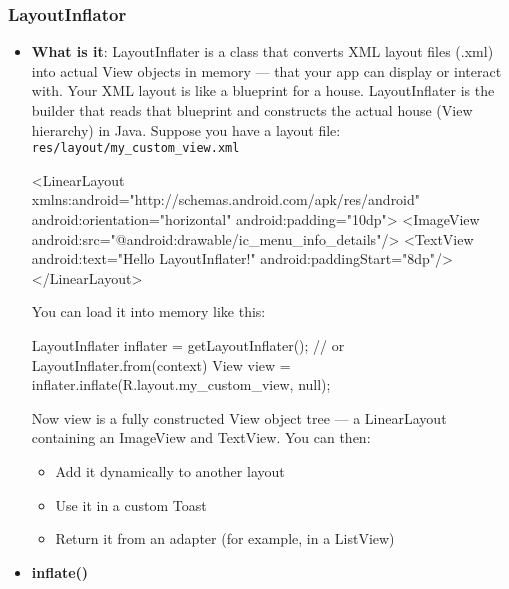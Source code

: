 \documentclass{report}
\begin{document}
    \subsubsection{LayoutInflator}
    \begin{itemize}
        \item \textbf{What is it}: LayoutInflater is a class that converts XML layout files (.xml) into actual View objects in memory — that your app can display or interact with.
            \bigbreak \noindent 
            Your XML layout is like a blueprint for a house. LayoutInflater is the builder that reads that blueprint and constructs the actual house (View hierarchy) in Java.
            \bigbreak \noindent 
            Suppose you have a layout file: \texttt{res/layout/my\_custom\_view.xml}
            \bigbreak \noindent 
            \begin{xmlcode}
                <LinearLayout xmlns:android="http://schemas.android.com/apk/res/android"
                    android:orientation="horizontal"
                    android:padding="10dp">
                    <ImageView android:src="@android:drawable/ic_menu_info_details"/>
                    <TextView android:text="Hello LayoutInflater!" android:paddingStart="8dp"/>
                </LinearLayout>
            \end{xmlcode}
            \bigbreak \noindent 
            You can load it into memory like this:
            \bigbreak \noindent 
            \begin{javacode}
                LayoutInflater inflater = getLayoutInflater();   // or LayoutInflater.from(context)
                View view = inflater.inflate(R.layout.my_custom_view, null);
            \end{javacode}
            \bigbreak \noindent 
            Now view is a fully constructed View object tree — a LinearLayout containing an ImageView and TextView.
            \bigbreak \noindent 
            You can then:
            \begin{itemize}
                \item Add it dynamically to another layout
                \item Use it in a custom Toast
                \item Return it from an adapter (for example, in a ListView)
            \end{itemize}
        \item \textbf{inflate()}
            \bigbreak \noindent 
            \begin{javacode}

\end{javacode}
\end{itemize}
\end{document}
